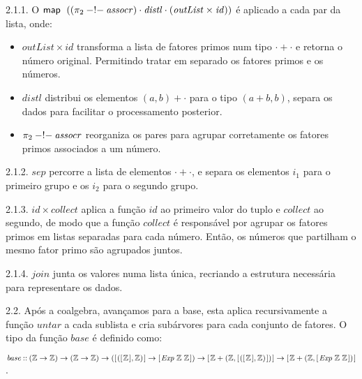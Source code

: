 \documentclass[11pt, a4paper, fleqn]{article}
\newcommand{\Conid}[1]{\mathit{#1}}
\newcommand{\Varid}[1]{\mathit{#1}}
\begin{document}
2.1.1. O \ensuremath{\map \;((\p2\mathbin{-!-}\Varid{assocr})\comp \Varid{distl}\comp (\Varid{outList}\times\Varid{id}))} é aplicado a cada par da lista, onde:
    \begin{itemize}
        \item \ensuremath{\Varid{outList}\times\Varid{id}} transforma a lista de fatores primos num tipo \ensuremath{\cdot +\cdot } e retorna o número original. Permitindo tratar em separado os fatores primos e os números. 
        \item \ensuremath{\Varid{distl}} distribui os elementos \ensuremath{(\Varid{a},\Varid{b})+\cdot } para o tipo \ensuremath{(\Varid{a}+\Varid{b},\Varid{b})}, separa os dados para facilitar o processamento posterior.
        \item \ensuremath{\p2\mathbin{-!-}\Varid{assocr}} reorganiza os pares para agrupar corretamente os fatores primos associados a um número.
    \end{itemize}

2.1.2. \ensuremath{\Varid{sep}} percorre a lista de elementos \ensuremath{\cdot +\cdot }, e separa os elementos \ensuremath{i_1} para o primeiro grupo e os \ensuremath{i_2} para o segundo grupo.

2.1.3. \ensuremath{\Varid{id}\times\Varid{collect}} aplica a função \ensuremath{\Varid{id}} ao primeiro valor do tuplo e \ensuremath{\Varid{collect}} ao segundo, de modo que a função \ensuremath{\Varid{collect}} é responsável por agrupar os fatores primos em listas separadas para cada número.
Então, os números que partilham o mesmo fator primo são agrupados juntos.

2.1.4. \ensuremath{\Varid{join}} junta os valores numa lista única, recriando a estrutura necessária para representare os dados.

2.2. Após a coalgebra, avançamos para a base, esta aplica recursivamente a função \ensuremath{\Varid{untar}} a cada sublista e cria subárvores para cada conjunto de fatores. O tipo da função \ensuremath{\Varid{base}} é definido como:

\ensuremath{\Varid{base}\mathbin{::}(\mathbb{Z}\to \mathbb{Z})\to (\mathbb{Z}\to \mathbb{Z})\to ([\mskip1.5mu ([\mskip1.5mu \mathbb{Z}\mskip1.5mu],\mathbb{Z})\mskip1.5mu]\to [\mskip1.5mu \Conid{Exp}\;\mathbb{Z}\;\mathbb{Z}\mskip1.5mu])\to [\mskip1.5mu \mathbb{Z}+(\mathbb{Z},[\mskip1.5mu ([\mskip1.5mu \mathbb{Z}\mskip1.5mu],\mathbb{Z})\mskip1.5mu])\mskip1.5mu]\to [\mskip1.5mu \mathbb{Z}+(\mathbb{Z},[\mskip1.5mu \Conid{Exp}\;\mathbb{Z}\;\mathbb{Z}\mskip1.5mu])\mskip1.5mu]}.
\end{document}
